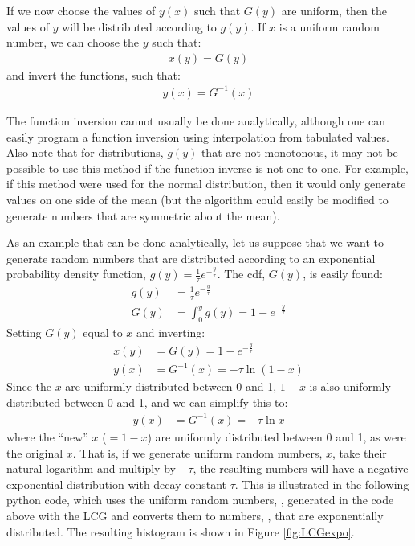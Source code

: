 If we now choose the values of $y(x)$ such that $G(y)$ are uniform, then the values of $y$ will be distributed according to $g(y)$. If $x$ is a uniform random number, we can choose the $y$ such that:
\begin{align*}
x(y) = G(y)
\end{align*}
and invert the functions, such that:
\begin{align*}
y(x) = G^{-1}(x)
\end{align*}

The function inversion cannot usually be done analytically, although one can easily program a function inversion using interpolation from tabulated values. Also note that for distributions, $g(y)$ that are not monotonous, it may not be possible to use this method if the function inverse is not one-to-one. For example, if this method were used for the normal distribution, then it would only generate values on one side of the mean (but the algorithm could easily be modified to generate numbers that are symmetric about the mean).

As an example that can be done analytically, let us suppose that we want to generate random numbers that are distributed according to an exponential probability density function, $g(y) = \frac{1}{\tau}e^{-\frac{y}{\tau}}$. The cdf, $G(y)$, is easily found:
\begin{align*}
g(y) &= \frac{1}{\tau}e^{-\frac{y}{\tau}}\nonumber\\
G(y) &= \int_{0}^y g(y) = 1- e^{-\frac{y}{\tau}} 
\end{align*}
Setting $G(y)$ equal to $x$ and inverting:
\begin{align*}
x(y) &= G(y)=1- e^{-\frac{y}{\tau}} \\
y(x) &= G^{-1}(x) = -\tau \ln(1-x) 
\end{align*}
Since the $x$ are uniformly distributed between 0 and 1, $1-x$ is also uniformly distributed between 0 and 1, and we can simplify this to:
\begin{align*}
y(x) &= G^{-1}(x) = -\tau \ln{x} 
\end{align*}
where the ``new'' $x$ ($=1-x$) are uniformly distributed between 0 and 1, as were the original $x$. That is, if we generate uniform random numbers, $x$, take their natural logarithm and multiply by $-\tau$, the resulting numbers will have a negative exponential distribution with decay constant $\tau$. This is illustrated in the following python code, which uses the uniform random numbers, , generated in the code above with the LCG and converts them to numbers, , that are exponentially distributed. The resulting histogram is shown in Figure \ref{fig:LCGexpo}.

